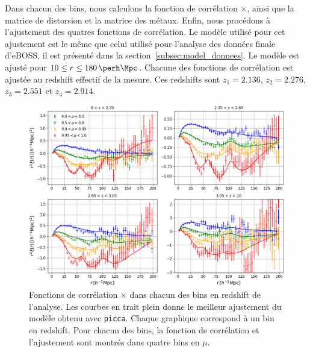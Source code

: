 \documentclass[11pt, twoside, a4paper, openright]{report}
\begin{document}
Dans chacun des bins, nous calculons la fonction de corrélation \lya{}$\times$\lya{}, ainsi que la matrice de distorsion et la matrice des métaux.
Enfin, nous procédons à l'ajustement des quatres fonctions de corrélation. Le modèle utilisé pour cet ajustement est le même que celui utilisé pour l'analyse des données finale d'eBOSS, il est présenté dans la section~\ref{subsec:model_donnees}.
Le modèle est ajusté pour $\num{10} \leq r \leq \SI{180}{\perh\Mpc}$.
Chacune des fonctions de corrélation est ajustée au redshift effectif de la mesure. Ces redshifts sont $z_1 = \num{2.136}$, $z_2 = \num{2.276}$, $z_3 = \num{2.551}$ et $z_4 = \num{2.914}$.

\begin{figure}
  \centering
  \includegraphics[scale=0.4]{dr16_4bins}
  \caption{Fonctions de corrélation \lya{}$\times$\lya{} dans chacun des bins en redshift de l'analyse. Les courbes en trait plein donne le meilleur ajustement du modèle obtenu avec \texttt{picca}. Chaque graphique correspond à un bin en redshift. Pour chacun des bins, la fonction de corrélation et l'ajustement sont montrés dans quatre bins en $\mu$.}
  \label{fig:dr16_4bins}
\end{figure}
\end{document}
